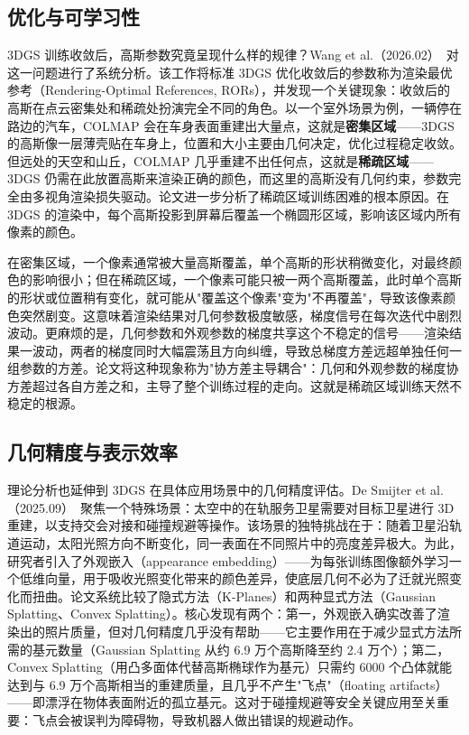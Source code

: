 \subsection{优化与可学习性}
\label{sec:01_4_3}

3DGS 训练收敛后，高斯参数究竟呈现什么样的规律？Wang et al.（2026.02）~\cite{2602_08909}对这一问题进行了系统分析。该工作将标准 3DGS 优化收敛后的参数称为渲染最优参考（Rendering-Optimal References, RORs），并发现一个关键现象：收敛后的高斯在点云密集处和稀疏处扮演完全不同的角色。以一个室外场景为例，一辆停在路边的汽车，COLMAP 会在车身表面重建出大量点，这就是\textbf{密集区域}——3DGS 的高斯像一层薄壳贴在车身上，位置和大小主要由几何决定，优化过程稳定收敛。但远处的天空和山丘，COLMAP 几乎重建不出任何点，这就是\textbf{稀疏区域}——3DGS 仍需在此放置高斯来渲染正确的颜色，而这里的高斯没有几何约束，参数完全由多视角渲染损失驱动。论文进一步分析了稀疏区域训练困难的根本原因。在 3DGS 的渲染中，每个高斯投影到屏幕后覆盖一个椭圆形区域，影响该区域内所有像素的颜色。

在密集区域，一个像素通常被大量高斯覆盖，单个高斯的形状稍微变化，对最终颜色的影响很小；但在稀疏区域，一个像素可能只被一两个高斯覆盖，此时单个高斯的形状或位置稍有变化，就可能从"覆盖这个像素"变为"不再覆盖"，导致该像素颜色突然剧变。这意味着渲染结果对几何参数极度敏感，梯度信号在每次迭代中剧烈波动。更麻烦的是，几何参数和外观参数的梯度共享这个不稳定的信号——渲染结果一波动，两者的梯度同时大幅震荡且方向纠缠，导致总梯度方差远超单独任何一组参数的方差。论文将这种现象称为"协方差主导耦合"：几何和外观参数的梯度协方差超过各自方差之和，主导了整个训练过程的走向。这就是稀疏区域训练天然不稳定的根源。

\subsection{几何精度与表示效率}
\label{sec:01_4_4}

理论分析也延伸到 3DGS 在具体应用场景中的几何精度评估。De Smijter et al.（2025.09）~\cite{2509_10241}聚焦一个特殊场景：太空中的在轨服务卫星需要对目标卫星进行 3D 重建，以支持交会对接和碰撞规避等操作。该场景的独特挑战在于：随着卫星沿轨道运动，太阳光照方向不断变化，同一表面在不同照片中的亮度差异极大。为此，研究者引入了外观嵌入（appearance embedding）——为每张训练图像额外学习一个低维向量，用于吸收光照变化带来的颜色差异，使底层几何不必为了迁就光照变化而扭曲。论文系统比较了隐式方法（K-Planes）和两种显式方法（Gaussian Splatting、Convex Splatting）。核心发现有两个：第一，外观嵌入确实改善了渲染出的照片质量，但对几何精度几乎没有帮助——它主要作用在于减少显式方法所需的基元数量（Gaussian Splatting 从约 6.9 万个高斯降至约 2.4 万个）；第二，Convex Splatting（用凸多面体代替高斯椭球作为基元）只需约 6000 个凸体就能达到与 6.9 万个高斯相当的重建质量，且几乎不产生"飞点"（floating artifacts）——即漂浮在物体表面附近的孤立基元。这对于碰撞规避等安全关键应用至关重要：飞点会被误判为障碍物，导致机器人做出错误的规避动作。

